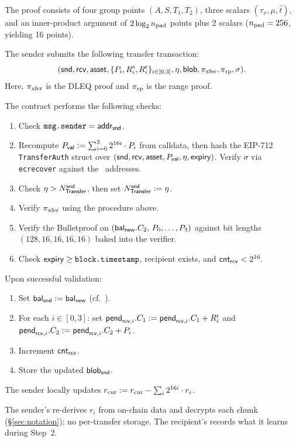 The proof consists of four group points $(A, S, T_1, T_2)$, three scalars $(\tau_x, \mu, \hat{t})$, and an inner-product argument of $2 \log_2 n_{\rm pad}$ points plus 2 scalars ($n_{\rm pad} = 256$, yielding 16 points).

\one
The sender submits the following transfer transaction:
%
\[
  ({\sf snd}, {\sf rcv}, \mathsf{asset}, \{P_{i}, R^{\rm s}_{i}, R^{\rm r}_{i}\}_{i \in [0,3]}, \eta, \mathsf{blob}, \pi_{\rm xfer}, \pi_{\rm rp}, \sigma).
\]
%
Here, $\pi_{\rm xfer}$ is the DLEQ proof and $\pi_{\rm rp}$ is the range proof.

The contract performs the following checks:
%
\begin{enumerate}[nosep]
  \item Check $\texttt{msg.sender} = {\mathsf{addr}}_{\sf snd}$.
  \item Recompute $P_\mathsf{val} := \sum_{i=0}^{3} 2^{16i} \cdot P_{i}$ from calldata, then hash the EIP-712 \texttt{TransferAuth} struct over $({\sf snd}, {\sf rcv}, \mathsf{asset}, P_\mathsf{val}, \eta, \mathsf{expiry})$.
  Verify $\sigma$ via \texttt{ecrecover} against the \CE\ addresses.
  \item Check $\eta > N_\mathsf{Transfer}^{\sf snd}$, then set $N_\mathsf{Transfer}^{\sf snd} := \eta$.
  \item Verify $\pi_{\rm xfer}$ using the procedure above.
  \item Verify the Bulletproof on $(\mathsf{bal}_{\mathsf{new}}.C_2,\, P_{0},\ldots, P_{3})$ against bit lengths $(128, 16, 16, 16, 16)$ baked into the verifier.
  \item Check $\mathsf{expiry} \ge \texttt{block.timestamp}$, recipient exists, and $\mathsf{cnt}_{\sf rcv} < 2^{16}$.
\end{enumerate}
%
\two
Upon successful validation:
%
\begin{enumerate}[nosep]
  \item Set $\mathsf{bal}_{\sf snd} := \mathsf{bal}_{\mathsf{new}}$ (cf.~).
  \item For each $i \in [0,3]$: set $\mathsf{pend}_{{\sf rcv},i}.C_1 := \mathsf{pend}_{{\sf rcv},i}.C_1 + R^{\rm r}_{i}$ and $\mathsf{pend}_{{\sf rcv},i}.C_2 := \mathsf{pend}_{{\sf rcv},i}.C_2 + P_{i}$.
  \item Increment $\mathsf{cnt}_{\sf rcv}$.
  \item Store the updated $\mathsf{blob}_{\sf snd}$.
\end{enumerate}
%
The sender locally updates $r_{\rm cur} := r_{\rm cur} - \sum_i 2^{16i} \cdot r_i$.

\one
{}
The sender's \CE re-derives $r_i$ from on-chain data and decrypts each chunk (\S\ref{sec:notation}); no per-transfer storage.
The recipient's \CE records what it learns during Step~2.
